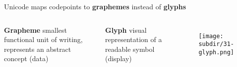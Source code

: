 \documentclass[../index.tex]{subfiles}
\begin{document}
\begin{frame}{\currenttitle}
%
%
%
%
  Unicode maps codepoints to \textbf{graphemes} instead of \textbf{glyphs} \\[1.5em]
  \begin{columns}[t]
    \textbf{Grapheme} \textendash{} 
        smallest functional unit of writing, represents an abstract concept (data)

    \textbf{Glyph} \textendash{}
        visual representation of a readable symbol (display) \\[2em]
    \begin{figure}
      \centering
      \texttt{[image: \\subdir/31-glyph.png]}
    \end{figure}
  \end{columns}
\end{frame}

\begin{frame}{\currenttitle}
%
%
%
  \begin{columns}[t]
    \textbf{}
  \end{columns}
\end{frame}
\end{document}
